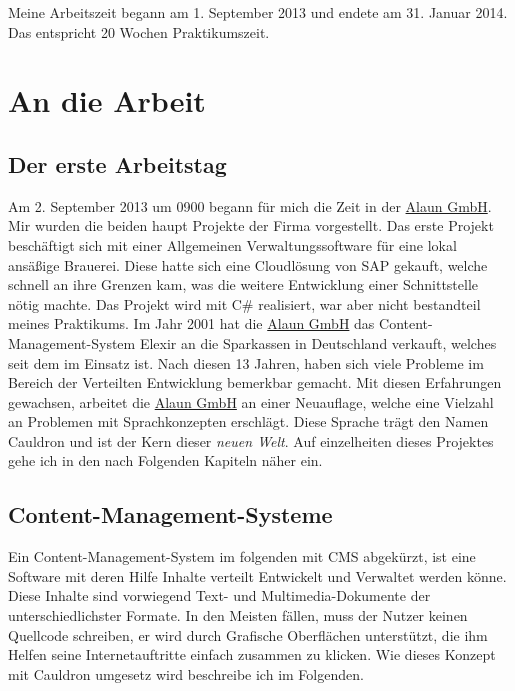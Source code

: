 \documentclass{scrartcl}
\begin{document}
Meine Arbeitszeit begann am 1. September 2013 und endete am 31. Januar 2014. Das entspricht 20 Wochen Praktikumszeit.

\newpage

\section{An die Arbeit}

\subsection{Der erste Arbeitstag}

Am 2. September 2013 um 0900 begann für mich die Zeit in der \href{https://alaun.de/home/}{Alaun GmbH}.
Mir wurden die beiden haupt Projekte der Firma vorgestellt. Das erste Projekt beschäftigt sich mit einer Allgemeinen
Verwaltungssoftware für eine lokal ansäßige Brauerei. Diese hatte sich eine Cloudlösung von SAP gekauft, welche
schnell an ihre Grenzen kam, was die weitere Entwicklung einer Schnittstelle nötig machte. Das Projekt wird mit C\#
realisiert, war aber nicht bestandteil meines Praktikums.
Im Jahr 2001 hat die \href{https://alaun.de/home/}{Alaun GmbH} das Content-Management-System Elexir an die Sparkassen
in Deutschland verkauft, welches seit dem im Einsatz ist. Nach diesen 13 Jahren, haben sich viele Probleme im Bereich
der Verteilten Entwicklung bemerkbar gemacht.
Mit diesen Erfahrungen gewachsen, arbeitet die \href{https://alaun.de/home/}{Alaun GmbH} an einer Neuauflage, welche
eine Vielzahl an Problemen mit Sprachkonzepten erschlägt. Diese Sprache trägt den Namen Cauldron und ist der Kern
dieser \textit{neuen Welt}.
Auf einzelheiten dieses Projektes gehe ich in den nach Folgenden Kapiteln näher ein. 

\subsection{Content-Management-Systeme}

Ein Content-Management-System im folgenden mit CMS abgekürzt, ist eine Software mit deren Hilfe Inhalte verteilt Entwickelt
und Verwaltet werden könne. Diese Inhalte sind vorwiegend Text- und Multimedia-Dokumente der unterschiedlichster Formate.
In den Meisten fällen, muss der Nutzer keinen Quellcode schreiben, er wird durch Grafische Oberflächen unterstützt, die
ihm Helfen seine Internetauftritte einfach zusammen zu klicken.
Wie dieses Konzept mit Cauldron umgesetz wird beschreibe ich im Folgenden.

 
\end{document}
